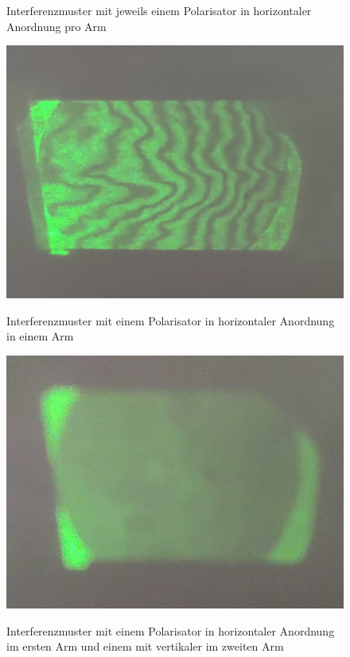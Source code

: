 \documentclass[ngerman]{scrartcl}
\begin{document}
\begin{figure}[H]
\begin{minipage}[t]{0.45\linewidth}
        \caption[Interferenzmuster ein Polarisator horizontal pro Arm]{Interferenzmuster mit jeweils einem Polarisator in horizontaler Anordnung pro Arm}
        \label{fig:michelson_pol_2_horizontal}
    \end{minipage}%
    \hspace*{\fill}
    \begin{minipage}[t]{0.45\linewidth}
        \centering
        \includegraphics[width=\linewidth]{fig/Compressed/Arago_horizontal_detail.jpg}
        \caption[Interferenzmuster ein Polarisator horizontal ein Arm]{Interferenzmuster mit einem Polarisator in horizontaler Anordnung in einem Arm}
        \label{fig:michelson_pol_1_horizontal}
        \includegraphics[width=\linewidth]{fig/Compressed/Arago_mixed Detail.jpg}
        \caption[Interferenzmuster zwei Polarisatoren gekreuzt]{Interferenzmuster mit einem Polarisator in horizontaler Anordnung im ersten Arm und einem mit vertikaler im zweiten Arm}
        \label{fig:michelson_pol_mixed}
    \end{minipage}
\end{figure}
\setcaphanging
\end{document}
